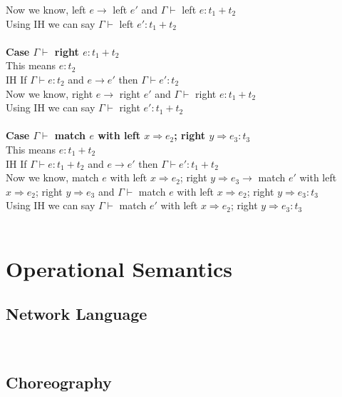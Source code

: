 \documentclass{article}
\begin{document}
Now we know, left $e \to$ left $e'$ and $\Gamma \vdash$ left $e : t_1+t_2$ \\
Using IH we can say $\Gamma \vdash$ left $ e' : t_1+t_2$ \\\\
\textbf{Case $\Gamma \vdash$ right $e : t_1+t_2$ } \\
This means $e : t_2$ \\
IH If $\Gamma \vdash e : t_2$ and  $e \to e'$ then $\Gamma \vdash e' : t_2$ \\
Now we know, right $e \to$ right $e'$ and $\Gamma \vdash$ right $e : t_1+t_2$ \\
Using IH we can say $\Gamma \vdash$ right $ e' : t_1+t_2$ \\\\

\textbf{Case $\Gamma \vdash$ match $e$ with left $x \Rightarrow e_2 $; right $ y \Rightarrow e_3 : t_3$ } \\
This means $e : t_1 + t_2$ \\
IH If $\Gamma \vdash e : t_1+t_2$ and  $e \to e'$ then $\Gamma \vdash e' : t_1+t_2$ \\
Now we know, match $e$ with left $x \Rightarrow e_2 $; right $ y \Rightarrow e_3 \to$
match $e'$ with left $x \Rightarrow e_2 $; right $ y \Rightarrow e_3$ and $\Gamma \vdash$ match $e$ with left $x \Rightarrow e_2 $; right $ y \Rightarrow e_3 : t_3$ \\
Using IH we can say $\Gamma \vdash$ match $e'$ with left $x \Rightarrow e_2 $; right $ y \Rightarrow e_3 : t_3$ \\\\


\section{Operational Semantics}
\subsection{Network Language}
\\
\subsection{Choreography}
\end{document}
